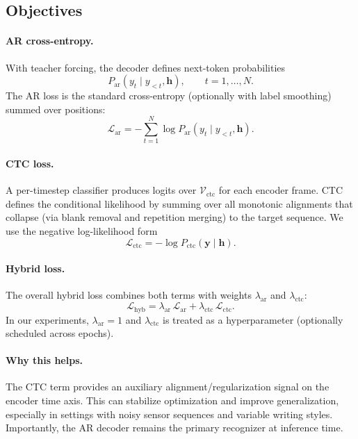 \subsection{Objectives}
\paragraph{AR cross-entropy.}
With teacher forcing, the decoder defines next-token probabilities
\begin{equation}
P_{\text{ar}}(y_t \mid y_{<t}, \mathbf{h}), \qquad t=1,\dots,N.
\end{equation}
The AR loss is the standard cross-entropy (optionally with label smoothing) summed over positions:
\begin{equation}
\mathcal{L}_{\text{ar}} = - \sum_{t=1}^{N} \log P_{\text{ar}}(y_t \mid y_{<t}, \mathbf{h}).
\end{equation}

\paragraph{CTC loss.}
A per-timestep classifier produces logits over $\mathcal{V}_{\text{ctc}}$ for each encoder frame.
CTC defines the conditional likelihood by summing over all monotonic alignments that collapse (via blank removal and repetition merging) to the target sequence.
We use the negative log-likelihood form
\begin{equation}
\mathcal{L}_{\text{ctc}} = -\log P_{\text{ctc}}(\mathbf{y} \mid \mathbf{h}).
\end{equation}

\paragraph{Hybrid loss.}
The overall hybrid loss combines both terms with weights $\lambda_{\text{ar}}$ and $\lambda_{\text{ctc}}$:
\begin{equation}
\mathcal{L}_{\text{hyb}} = \lambda_{\text{ar}}\, \mathcal{L}_{\text{ar}} + \lambda_{\text{ctc}}\, \mathcal{L}_{\text{ctc}}.
\label{eq:hybrid-loss}
\end{equation}
In our experiments, $\lambda_{\text{ar}}=1$ and $\lambda_{\text{ctc}}$ is treated as a hyperparameter (optionally scheduled across epochs).

\paragraph{Why this helps.}
The CTC term provides an auxiliary alignment/regularization signal on the encoder time axis.
This can stabilize optimization and improve generalization, especially in settings with noisy sensor sequences and variable writing styles.
Importantly, the AR decoder remains the primary recognizer at inference time.


